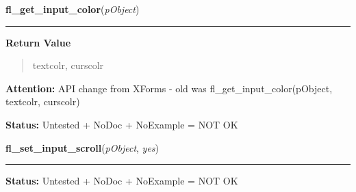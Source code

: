     \label{xformslib:library:fl_get_input_color}

    \vspace{0.5ex}

\hspace{.8\funcindent}\begin{boxedminipage}{\funcwidth}

    \raggedright \textbf{fl\_get\_input\_color}(\textit{pObject})

    \vspace{-1.5ex}

    \rule{\textwidth}{0.5\fboxrule}
\setlength{\parskip}{2ex}
\setlength{\parskip}{1ex}
      \textbf{Return Value}
    \vspace{-1ex}

      \begin{quote}
      textcolr, curscolr

      \end{quote}

\textbf{Attention:} API change from XForms - old was fl\_get\_input\_color(pObject, textcolr, 
curscolr)



\textbf{Status:} Untested + NoDoc + NoExample = NOT OK



    \end{boxedminipage}

    \label{xformslib:library:fl_set_input_scroll}

    \vspace{0.5ex}

\hspace{.8\funcindent}\begin{boxedminipage}{\funcwidth}

    \raggedright \textbf{fl\_set\_input\_scroll}(\textit{pObject}, \textit{yes})

    \vspace{-1.5ex}

    \rule{\textwidth}{0.5\fboxrule}
\setlength{\parskip}{2ex}
\setlength{\parskip}{1ex}
\textbf{Status:} Untested + NoDoc + NoExample = NOT OK



    \end{boxedminipage}

